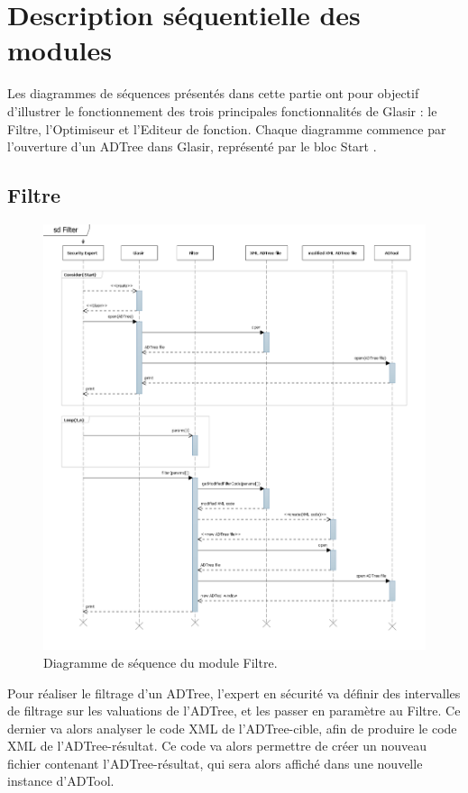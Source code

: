 \section{Description séquentielle des modules}
    \label{sec:modules}
    
Les diagrammes de séquences présentés dans cette partie ont pour objectif d'illustrer le fonctionnement des trois principales fonctionnalités de Glasir : le Filtre, l'Optimiseur et l'Editeur de fonction. Chaque diagramme commence par l'ouverture d'un ADTree dans Glasir, représenté par le bloc \og Start \fg{}.

	\subsection{Filtre}

	    \begin{figure}[H]
	        \centering
	        \includegraphics[height=1\textwidth]{figure/Filter.png}
	        \caption{Diagramme de séquence du module Filtre.}
	        \label{fig:filter}
	    \end{figure}

Pour réaliser le filtrage d'un ADTree, l'expert en sécurité va définir des intervalles de filtrage sur les valuations de l'ADTree, et les passer en paramètre au Filtre. Ce dernier va alors analyser le code XML de l'ADTree-cible, afin de produire le code XML de l'ADTree-résultat. Ce code va alors permettre de créer un nouveau fichier contenant l'ADTree-résultat, qui sera alors affiché dans une nouvelle instance d'ADTool.

